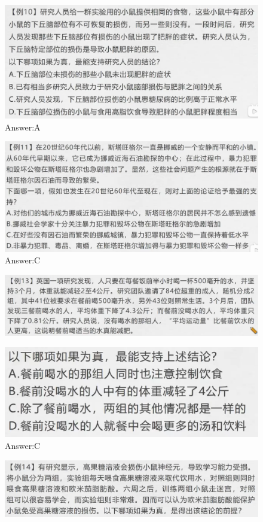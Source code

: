 \documentclass{article}
\numberwithin{equation}{section}						%
\numberwithin{figure}{section}							%
\begin{document}
\begin{sloppypar}
\begin{figure}[H]
     \centering
     \includegraphics[width=0.6\linewidth]{232.png}
		\caption{Answer:A}
\end{figure}


\begin{figure}[H]
     \centering
     \includegraphics[width=0.6\linewidth]{233.png}
		\caption{Answer:C}
\end{figure}



\begin{figure}[H]
     \centering
     \includegraphics[width=0.6\linewidth]{234.png}
\end{figure}


\begin{figure}[H]
     \centering
     \includegraphics[width=0.4\linewidth]{235.png}
		\caption{Answer:C}
\end{figure}


\begin{figure}[H]
     \centering
     \includegraphics[width=0.6\linewidth]{236.png}
\end{figure}



\end{sloppypar}
\end{document}
